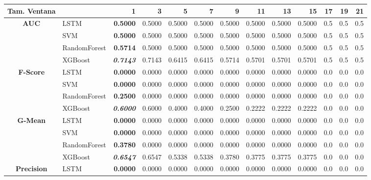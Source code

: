 \begin{table}[H]
	\centering
	\begin{adjustbox}{max width=14cm}
		\begin{tabular}{|c|l|r|r|r|r|r|r|r|r|r|r|r|}
			\hline
			\textbf{Tam. Ventana}&         &      1  &      3  &      5  &      7  &      9  &      11 &      13 &      15 &   17 &   19 &   21 \\
			\hline
			\textbf{AUC} &  LSTM & \textbf{  0.5000 } &  0.5000 &  0.5000 &  0.5000 &  0.5000 &  0.5000 &  0.5000 &  0.5000 &  0.5 &  0.5 &  0.5 \\
			&  SVM & \textbf{  0.5000 } &  0.5000 &  0.5000 &  0.5000 &  0.5000 &  0.5000 &  0.5000 &  0.5000 &  0.5 &  0.5 &  0.5 \\
			&  RandomForest & \textbf{  0.5714 } &  0.5000 &  0.5000 &  0.5000 &  0.5000 &  0.5000 &  0.5000 &  0.5000 &  0.5 &  0.5 &  0.5 \\
			&  XGBoost & \textit{ \textbf{  0.7143 } } &  0.7143 &  0.6415 &  0.6415 &  0.5714 &  0.5701 &  0.5701 &  0.5701 &  0.5 &  0.5 &  0.5 \\
			\hline
			\textbf{F-Score} &  LSTM & \textbf{  0.0000 } &  0.0000 &  0.0000 &  0.0000 &  0.0000 &  0.0000 &  0.0000 &  0.0000 &  0.0 &  0.0 &  0.0 \\
			&  SVM & \textbf{  0.0000 } &  0.0000 &  0.0000 &  0.0000 &  0.0000 &  0.0000 &  0.0000 &  0.0000 &  0.0 &  0.0 &  0.0 \\
			&  RandomForest & \textbf{  0.2500 } &  0.0000 &  0.0000 &  0.0000 &  0.0000 &  0.0000 &  0.0000 &  0.0000 &  0.0 &  0.0 &  0.0 \\
			&  XGBoost & \textit{ \textbf{  0.6000 } } &  0.6000 &  0.4000 &  0.4000 &  0.2500 &  0.2222 &  0.2222 &  0.2222 &  0.0 &  0.0 &  0.0 \\
			\hline
			\textbf{G-Mean} &  LSTM & \textbf{  0.0000 } &  0.0000 &  0.0000 &  0.0000 &  0.0000 &  0.0000 &  0.0000 &  0.0000 &  0.0 &  0.0 &  0.0 \\
			&  SVM & \textbf{  0.0000 } &  0.0000 &  0.0000 &  0.0000 &  0.0000 &  0.0000 &  0.0000 &  0.0000 &  0.0 &  0.0 &  0.0 \\
			&  RandomForest & \textbf{  0.3780 } &  0.0000 &  0.0000 &  0.0000 &  0.0000 &  0.0000 &  0.0000 &  0.0000 &  0.0 &  0.0 &  0.0 \\
			&  XGBoost & \textit{ \textbf{  0.6547 } } &  0.6547 &  0.5338 &  0.5338 &  0.3780 &  0.3775 &  0.3775 &  0.3775 &  0.0 &  0.0 &  0.0 \\
			\hline
			\textbf{Precision} &  LSTM & \textbf{  0.0000 } &  0.0000 &  0.0000 &  0.0000 &  0.0000 &  0.0000 &  0.0000 &  0.0000 &  0.0 &  0.0 &  0.0 \\

\end{tabular}
\end{adjustbox}
\end{table}
